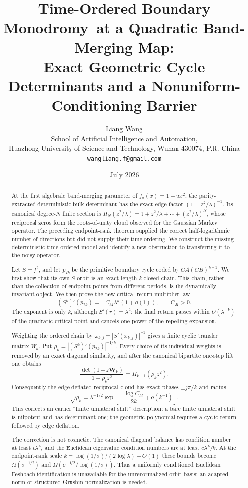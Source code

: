 \documentclass[11pt]{article}
\title{\textbf{Time-Ordered Boundary Monodromy}\
\textbf{at a Quadratic Band-Merging Map:}\\[0.35em]
\large Exact Geometric Cycle Determinants and a Nonuniform-Conditioning Barrier}
\author{Liang Wang\\
\small School of Artificial Intelligence and Automation,\\[-0.2em]
\small Huazhong University of Science and Technology, Wuhan 430074, P.R. China\\
\small \texttt{wangliang.f@gmail.com}}
\date{July 2026}
\theoremstyle{definition}
\theoremstyle{remark}
\newcommand{\Id}{\mathrm I}
\begin{document}
\maketitle

\begin{abstract}
At the first algebraic band-merging parameter of
$f_u(x)=1-u x^2$, the parity-extracted deterministic bulk determinant has
the exact edge factor $(1-z^2/\lambda)^{-1}$.  Its canonical degree-$N$
finite section is
$\Pi_N(z^2/\lambda)=1+z^2/\lambda+\cdots+(z^2/\lambda)^N$,
whose reciprocal zeros form the roots-of-unity cloud observed for the
Gaussian Markov operator.  The preceding endpoint-rank theorem supplied the
correct half-logarithmic number of directions but did not supply their time
ordering.  We construct the missing deterministic time-ordered model and
identify a new obstruction to transferring it to the noisy operator.

Let $S=f^2$, and let $p_{2k}$ be the primitive boundary cycle coded by
$CA(CB)^{k-1}$.  We first show that its own $S$-orbit is an exact length-$k$
closed chain.  This chain, rather than the collection of endpoint points from
different periods, is the dynamically invariant object.  We then prove the
new critical-return multiplier law
\[
 (S^k)'(p_{2k})=-C_M\lambda^k(1+o(1)),
 \qquad C_M>0.
\]
The exponent is only $k$, although $S'(r)=\lambda^2$: the final return passes
within $O(\lambda^{-k})$ of the quadratic critical point and cancels one
power of the repelling expansion.

Weighting the ordered chain by $\omega_{k,j}=|S'(x_{k,j})|^{-1}$ gives a
finite cyclic transfer matrix $W_k$.  Put
$\rho_k=|(S^k)'(p_{2k})|^{-1/k}$.  Every choice of its individual weights is
removed by an exact diagonal similarity, and after the canonical bipartite
one-step lift one obtains
\[
 \boxed{
 \frac{\det(\Id-z\mathbf W_k)}{1-\rho_kz^2}
 =\Pi_{k-1}(\rho_kz^2).}
\]
Consequently the edge-deflated reciprocal cloud has exact phases
$\pm j\pi/k$ and radius
\[
 \sqrt{\rho_k}
 =\lambda^{-1/2}
 \exp\!\left[-\frac{\log C_M}{2k}+o(k^{-1})\right].
\]
This corrects an earlier ``finite unilateral shift'' description: a bare
finite unilateral shift is nilpotent and has determinant one; the geometric
polynomial requires a cyclic return followed by edge deflation.

The correction is not cosmetic.  The canonical diagonal balance has
condition number at least $c\lambda^k$, and the Euclidean eigenvalue
condition numbers are at least $c\lambda^k/k$.  At the endpoint-rank scale
$k=\log(1/\sigma)/(2\log\lambda)+O(1)$ these bounds become
$\Omega(\sigma^{-1/2})$ and
$\Omega(\sigma^{-1/2}/\log(1/\sigma))$.  Thus a uniformly conditioned
Euclidean Feshbach identification is unavailable for the unrenormalized
orbit basis; an adapted norm or structured Grushin normalization is needed.


\end{abstract}
\end{document}
